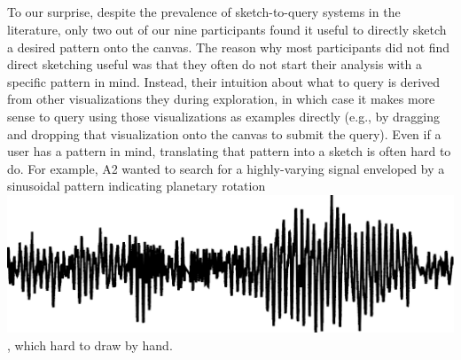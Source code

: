  \subsection{}
 \par {} To our surprise,
 despite the prevalence of sketch-to-query
 systems in the literature,  only two out of our nine participants
 found it useful to directly
 sketch a desired pattern onto the canvas. %
 The reason why most participants
 did not find direct sketching useful was that
 they often do not start their analysis with a specific pattern in mind.
 Instead, their intuition about what to query is derived
 from other visualizations they 
 during exploration, in which case it makes
 more sense to query using those visualizations
 as examples directly (e.g., by dragging and dropping
 that visualization onto the canvas to submit the query).
 Even if a user has a pattern in mind,
 translating that pattern into a sketch is often hard
 to do. For example,
 A2 wanted to search for a highly-varying signal
 enveloped by a sinusoidal pattern indicating
 planetary rotation \includegraphics[width=2\baselineskip,keepaspectratio]{figures/impossible_sketch.png}, which  hard to draw by hand.

